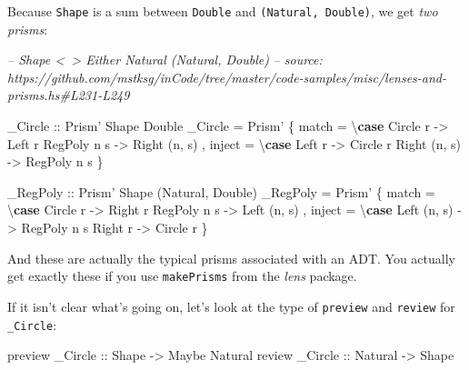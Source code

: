 \documentclass[]{article}
\newenvironment{Shaded}{}{}
\newcommand{\CommentTok}[1]{\textcolor[rgb]{0.38,0.63,0.69}{\textit{#1}}}
\newcommand{\DataTypeTok}[1]{\textcolor[rgb]{0.56,0.13,0.00}{#1}}
\newcommand{\FunctionTok}[1]{\textcolor[rgb]{0.02,0.16,0.49}{#1}}
\newcommand{\KeywordTok}[1]{\textcolor[rgb]{0.00,0.44,0.13}{\textbf{#1}}}
\newcommand{\NormalTok}[1]{#1}
\newcommand{\OtherTok}[1]{\textcolor[rgb]{0.00,0.44,0.13}{#1}}
\begin{document}
Because \texttt{Shape} is a sum between \texttt{Double} and
\texttt{(Natural,\ Double)}, we get \emph{two prisms}:

\begin{Shaded}
\begin{Highlighting}[]
\CommentTok{-- Shape <~> Either Natural (Natural, Double)}
\CommentTok{-- source: https://github.com/mstksg/inCode/tree/master/code-samples/misc/lenses-and-prisms.hs#L231-L249}

\OtherTok{_Circle ::} \DataTypeTok{Prism'} \DataTypeTok{Shape} \DataTypeTok{Double}
\NormalTok{_Circle }\FunctionTok{=} \DataTypeTok{Prism'}
\NormalTok{    \{ match  }\FunctionTok{=}\NormalTok{ \textbackslash{}}\KeywordTok{case}
        \DataTypeTok{Circle}\NormalTok{  r    }\OtherTok{->} \DataTypeTok{Left}\NormalTok{ r}
        \DataTypeTok{RegPoly}\NormalTok{ n s  }\OtherTok{->} \DataTypeTok{Right}\NormalTok{ (n, s)}
\NormalTok{    , inject }\FunctionTok{=}\NormalTok{ \textbackslash{}}\KeywordTok{case}
        \DataTypeTok{Left}\NormalTok{   r     }\OtherTok{->} \DataTypeTok{Circle}\NormalTok{ r}
        \DataTypeTok{Right}\NormalTok{ (n, s) }\OtherTok{->} \DataTypeTok{RegPoly}\NormalTok{ n s}
\NormalTok{    \}}

\OtherTok{_RegPoly ::} \DataTypeTok{Prism'} \DataTypeTok{Shape}\NormalTok{ (}\DataTypeTok{Natural}\NormalTok{, }\DataTypeTok{Double}\NormalTok{)}
\NormalTok{_RegPoly }\FunctionTok{=} \DataTypeTok{Prism'}
\NormalTok{    \{ match  }\FunctionTok{=}\NormalTok{ \textbackslash{}}\KeywordTok{case}
        \DataTypeTok{Circle}\NormalTok{  r    }\OtherTok{->} \DataTypeTok{Right}\NormalTok{ r}
        \DataTypeTok{RegPoly}\NormalTok{ n s  }\OtherTok{->} \DataTypeTok{Left}\NormalTok{ (n, s)}
\NormalTok{    , inject }\FunctionTok{=}\NormalTok{ \textbackslash{}}\KeywordTok{case}
        \DataTypeTok{Left}\NormalTok{  (n, s) }\OtherTok{->} \DataTypeTok{RegPoly}\NormalTok{ n s}
        \DataTypeTok{Right}\NormalTok{  r     }\OtherTok{->} \DataTypeTok{Circle}\NormalTok{ r}
\NormalTok{    \}}
\end{Highlighting}
\end{Shaded}

And these are actually the typical prisms associated with an ADT. You actually
get exactly these if you use \texttt{makePrisms} from the \emph{lens} package.

If it isn't clear what's going on, let's look at the type of \texttt{preview}
and \texttt{review} for \texttt{\_Circle}:

\begin{Shaded}
\begin{Highlighting}[]
\NormalTok{preview}\OtherTok{ _Circle ::} \DataTypeTok{Shape}   \OtherTok{->} \DataTypeTok{Maybe} \DataTypeTok{Natural}
\NormalTok{review}\OtherTok{  _Circle ::} \DataTypeTok{Natural} \OtherTok{->} \DataTypeTok{Shape}
\end{Highlighting}
\end{Shaded}
\end{document}
